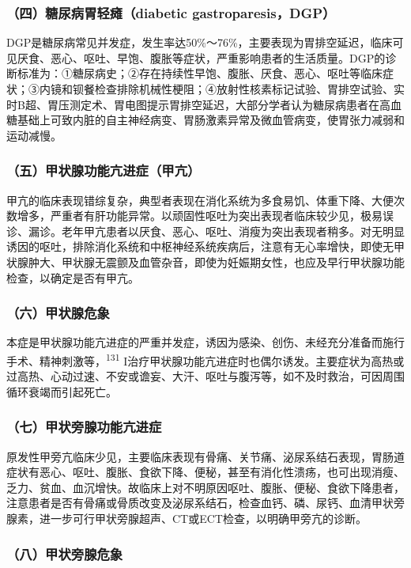 \subsubsection{（四）糖尿病胃轻瘫（diabetic gastroparesis，DGP）}

DGP是糖尿病常见并发症，发生率达50\%～76\%，主要表现为胃排空延迟，临床可见厌食、恶心、呕吐、早饱、腹胀等症状，严重影响患者的生活质量。DGP的诊断标准为：①糖尿病史；②存在持续性早饱、腹胀、厌食、恶心、呕吐等临床症状；③内镜和钡餐检查排除机械性梗阻；④放射性核素标记试验、胃排空试验、实时B超、胃压测定术、胃电图提示胃排空延迟，大部分学者认为糖尿病患者在高血糖基础上可致内脏的自主神经病变、胃肠激素异常及微血管病变，使胃张力减弱和运动减慢。

\subsubsection{（五）甲状腺功能亢进症（甲亢）}

甲亢的临床表现错综复杂，典型者表现在消化系统为多食易饥、体重下降、大便次数增多，严重者有肝功能异常。以顽固性呕吐为突出表现者临床较少见，极易误诊、漏诊。老年甲亢患者以厌食、恶心、呕吐、消瘦为突出表现者稍多。对无明显诱因的呕吐，排除消化系统和中枢神经系统疾病后，注意有无心率增快，即使无甲状腺肿大、甲状腺无震颤及血管杂音，即使为妊娠期女性，也应及早行甲状腺功能检查，以确定是否有甲亢。

\subsubsection{（六）甲状腺危象}

本症是甲状腺功能亢进症的严重并发症，诱因为感染、创伤、未经充分准备而施行手术、精神刺激等，\textsuperscript{131}
I治疗甲状腺功能亢进症时也偶尔诱发。主要症状为高热或过高热、心动过速、不安或谵妄、大汗、呕吐与腹泻等，如不及时救治，可因周围循环衰竭而引起死亡。

\subsubsection{（七）甲状旁腺功能亢进症}

原发性甲旁亢临床少见，主要临床表现有骨痛、关节痛、泌尿系结石表现，胃肠道症状有恶心、呕吐、腹胀、食欲下降、便秘，甚至有消化性溃疡，也可出现消瘦、乏力、贫血、血沉增快。故临床上对不明原因呕吐、腹胀、便秘、食欲下降患者，注意患者是否有骨痛或骨质改变及泌尿系结石，检查血钙、磷、尿钙、血清甲状旁腺素，进一步可行甲状旁腺超声、CT或ECT检查，以明确甲旁亢的诊断。

\subsubsection{（八）甲状旁腺危象}

